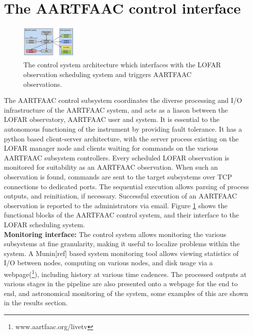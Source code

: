 \documentclass{ws-jai}
\begin{document}
\section {\label{sec:acontrol} The AARTFAAC control interface}
\begin{figure}[htbp]
\centering
\includegraphics[width=0.25\textwidth]{Figs/control_sys.png}
\caption{The  control  system  architecture  which  interfaces  with  the  LOFAR
  observation scheduling system and triggers AARTFAAC observations.}
\label{fig:afaac_ctrl_sys}
\end{figure}
The  AARTFAAC  control subsystem  coordinates  the  diverse processing  and  I/O
infrastructure of  the AARTFAAC system, and  acts as a liason  between the LOFAR
observatory,  AARTFAAC user  and  system.   It is  essential  to the  autonomous
functioning of  the instrument by  providing fault  tolerance.  It has  a python
based client-server architecture, with the  server process existing on the LOFAR
manager node and clients waiting for  commands on the various AARTFAAC subsystem
controllers. Every scheduled  LOFAR observation is monitored  for suitability as
an AARTFAAC observation. When such an observation is found, commands are sent to
the target subsystems  over TCP connections to dedicated  ports.  The sequential
execution   allows   parsing   of   process  outputs,   and   reinitiation,   if
necessary. Successful  execution of an  AARTFAAC observation is reported  to the
administrators via email.  Figure  \ref{fig:afaac_ctrl_sys} shows the functional
blocks  of  the AARTFAAC  control  system,  and  their  interface to  the  LOFAR
scheduling system.\\  

\noindent \textbf {Monitoring interface:} The control system allows monitoring the various
subsystems at fine granularity, making it useful to localize problems within the
system. A Munin[ref]  based system monitoring tool allows  viewing statistics of
I/O  between  nodes,   computing  on  various  nodes,  and  disk   usage  via  a
webpage(\footnote{www.aartfaac.org/livetv}), including  history at  various time
cadences.  The processed  outputs at  various stages  in the  pipeline are  also
presented onto a webpage for the end  to end, and astronomical monitoring of the
system, some examples of this are shown in the results section.
\end{document}
